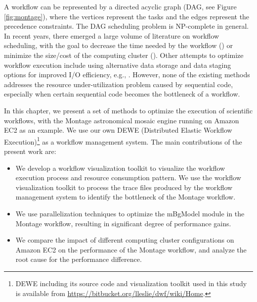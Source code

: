 A workflow can be represented by a directed acyclic graph (DAG, see Figure \ref{fig:montage}), where the vertices represent the tasks and the edges represent the precedence constraints. The DAG scheduling problem is NP-complete in general. In recent years, there emerged a large volume of literature on workflow scheduling, with the goal to decrease the time needed by the workflow (\cite{Topcuouglu:2002:PLT:566137.566142, Tanaka:2012:WSM:2310096.2310129}) or minimize the size/cost of the computing cluster (\cite{MaoSC2011, %
Leslie13}). Other attempts to optimize workflow execution include using alternative data storage and data staging options for improved I/O efficiency, e.g., \cite{pushpull, Juve2010, leeccgrid2013, leeiccs2014}. However, none of the existing methods addresses the resource under-utilization problem caused by sequential code, especially when certain sequential code becomes the bottleneck of a workflow. 

In this chapter, we present a set of methods to optimize the execution of scientific workflows, with the Montage astronomical mosaic engine running on Amazon EC2 as an example. We use our own DEWE (Distributed Elastic Workflow Execution)\footnote{DEWE including its source code and visualization toolkit used in this study is available from \url{https://bitbucket.org/lleslie/dwf/wiki/Home}.} as a workflow management system. The main contributions of the present work are:

\begin{itemize}
	\item We develop a workflow visualization toolkit to visualize the workflow execution process and resource consumption pattern. We use the workflow visualization toolkit to process the trace files produced by the workflow management system to identify the bottleneck of the Montage workflow.
	\item We use parallelization techniques to optimize the mBgModel module in the Montage workflow, resulting in significant degree of performance gains.
	\item We compare the impact of different computing cluster configurations on Amazon EC2 on the performance of the Montage workflow, and analyze the root cause for the performance difference. 
\end{itemize}

